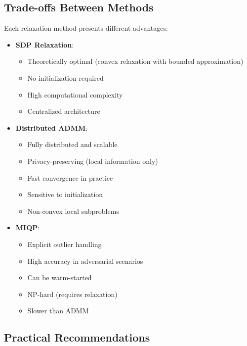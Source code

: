 \documentclass[11pt,a4paper]{article}
\begin{document}
\subsection{Trade-offs Between Methods}

Each relaxation method presents different advantages:

\begin{itemize}
    \item \textbf{SDP Relaxation}:
    \begin{itemize}
        \item[+] Theoretically optimal (convex relaxation with bounded approximation)
        \item[+] No initialization required
        \item[$-$] High computational complexity
        \item[$-$] Centralized architecture
    \end{itemize}
    
    \item \textbf{Distributed ADMM}:
    \begin{itemize}
        \item[+] Fully distributed and scalable
        \item[+] Privacy-preserving (local information only)
        \item[+] Fast convergence in practice
        \item[$-$] Sensitive to initialization
        \item[$-$] Non-convex local subproblems
    \end{itemize}
    
    \item \textbf{MIQP}:
    \begin{itemize}
        \item[+] Explicit outlier handling
        \item[+] High accuracy in adversarial scenarios
        \item[+] Can be warm-started
        \item[$-$] NP-hard (requires relaxation)
        \item[$-$] Slower than ADMM
    \end{itemize}
\end{itemize}

\subsection{Practical Recommendations}
\end{document}
